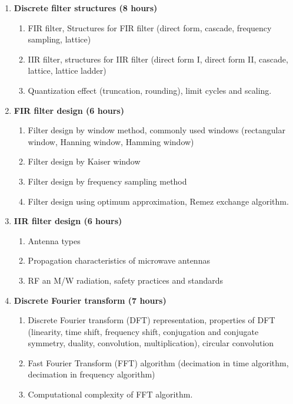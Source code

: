 \begin{enumerate}
  \item \textbf{Discrete filter structures  \hfill (8 hours)}
    \begin{enumerate}
      \item FIR filter, Structures for FIR filter (direct form, cascade, frequency sampling, lattice)
      \item IIR filter, structures for IIR filter (direct form I, direct form II, cascade, lattice, lattice ladder)
      \item Quantization effect (truncation, rounding), limit cycles and scaling.
    \end{enumerate}
    \vs
    
  \item \textbf{FIR filter design \hfill (6 hours)}
    \begin{enumerate}
      \item Filter design by window method, commonly used windows (rectangular window, Hanning window, Hamming window)
      \item Filter design by Kaiser window
      \item Filter design by frequency sampling method
      \item Filter design using optimum approximation, Remez exchange algorithm.
    \end{enumerate}
    \vs
    
  \item \textbf{IIR filter design \hfill (6 hours)}
    \begin{enumerate}
      \item Antenna types
      \item Propagation characteristics of microwave antennas
      \item RF an M/W radiation, safety practices and standards
    \end{enumerate}
    \vs

  \item \textbf{Discrete Fourier transform \hfill (7 hours)}
    \begin{enumerate}
      \item Discrete Fourier transform (DFT) representation, properties of DFT (linearity, time shift, frequency shift, conjugation and conjugate symmetry, duality, convolution, multiplication), circular convolution
      \item Fast Fourier Transform (FFT) algorithm (decimation in time algorithm, decimation in frequency algorithm)
      \item Computational complexity of FFT algorithm.
    \end{enumerate}
    \vs
\end{enumerate}
\Vs

